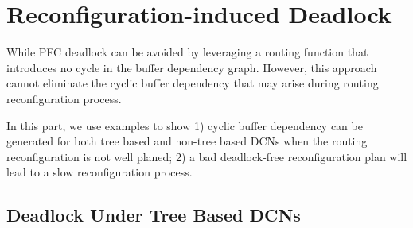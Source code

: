 \section{Reconfiguration-induced Deadlock}\label{sec:reconfigdeadlock}



While PFC deadlock can be avoided by leveraging a routing function that introduces no cycle in the buffer dependency graph. However, this approach cannot eliminate the cyclic buffer dependency that may arise during routing reconfiguration process.

In this part, we use examples to show 1) cyclic buffer dependency can be generated for both tree based and non-tree based DCNs when the routing reconfiguration is not well planed; 2) a bad deadlock-free reconfiguration plan will lead to a slow reconfiguration process.

\subsection{Deadlock Under Tree Based DCNs}\label{subsec:treecase}

